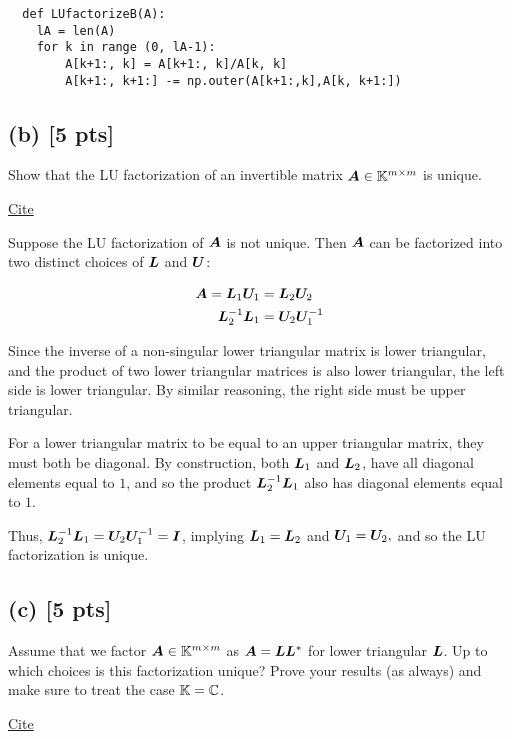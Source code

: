 \documentclass[twoside,10pt]{article}
\begin{document}
\begin{verbatim}
  def LUfactorizeB(A):
    lA = len(A)
    for k in range (0, lA-1):
        A[k+1:, k] = A[k+1:, k]/A[k, k]
        A[k+1:, k+1:] -= np.outer(A[k+1:,k],A[k, k+1:])
\end{verbatim}

\subsection*{(b) [5 pts]}
Show that the LU factorization of an invertible matrix $\bm{A} \in \mathbb{K}^{m \times m}$ is unique. 

\href{https://www2.umbc.edu/photonics/Menyuk/ENEE605/menyuk_ENEE605_lecture4_130908n.pdf}{Cite}

Suppose the LU factorization of $\bm{A}$ is not unique.
Then $\bm{A}$ can be factorized into two distinct choices of $\bm{L}$ and $\bm{U}$:

\begin{align*}
\bm{A} = \bm{L}_1\bm{U}_1 &= \bm{L}_2\bm{U}_2\\
\bm{L}_2^{-1}\bm{L}_1 &= \bm{U}_2\bm{U}_1^{-1}
\end{align*}

Since the inverse of a non-singular lower triangular matrix is lower triangular, and the product of two lower triangular matrices is also lower triangular, the left side is lower triangular.
By similar reasoning, the right side must be upper triangular.

For a lower triangular matrix to be equal to an upper triangular matrix, they must both be diagonal.
By construction, both $\bm{L}_1$ and $\bm{L}_2$, have all diagonal elements equal to $1$, and so the product $\bm{L}_2^{-1}\bm{L}_1$ also has diagonal elements equal to $1$.

Thus, $\bm{L}_2^{-1}\bm{L}_1 = \bm{U}_2\bm{U}_1^{-1} = \bm{I}$, implying $\bm{L}_1 = \bm{L}_2$ and $\bm{U}_1 = \bm{U}_2,$ and so the LU factorization is unique.

\subsection*{(c) [5 pts]}
Assume that we factor $\bm{A} \in \mathbb{K}^{m \times m}$ as $\bm{A} = \bm{L} \bm{L}^{*}$ for lower triangular $\bm{L}$.  
Up to which choices is this factorization unique? 
Prove your results (as always) and make sure to treat the case $\mathbb{K} = \mathbb{C}$. 

\href{https://math.stackexchange.com/a/2520957}{Cite}
\end{document}
